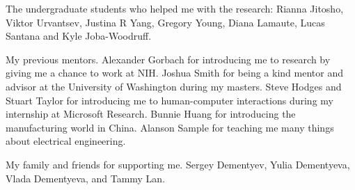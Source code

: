 The undergraduate students who helped me with the research: Rianna Jitosho, Viktor Urvantsev, Justina R Yang, Gregory Young, Diana Lamaute, Lucas Santana and Kyle Joba-Woodruff. 

My previous mentors. Alexander Gorbach for introducing me to research by giving me a chance to work at NIH. Joshua Smith for being a kind mentor and advisor at the University of Washington during my masters. Steve Hodges and Stuart Taylor for introducing me to human-computer interactions during my internship at Microsoft Research. Bunnie Huang for introducing the manufacturing world in China. Alanson Sample for teaching me many things about electrical engineering. 

My family and friends for supporting me. Sergey Dementyev, Yulia Dementyeva, Vlada Dementyeva, and Tammy Lan.

